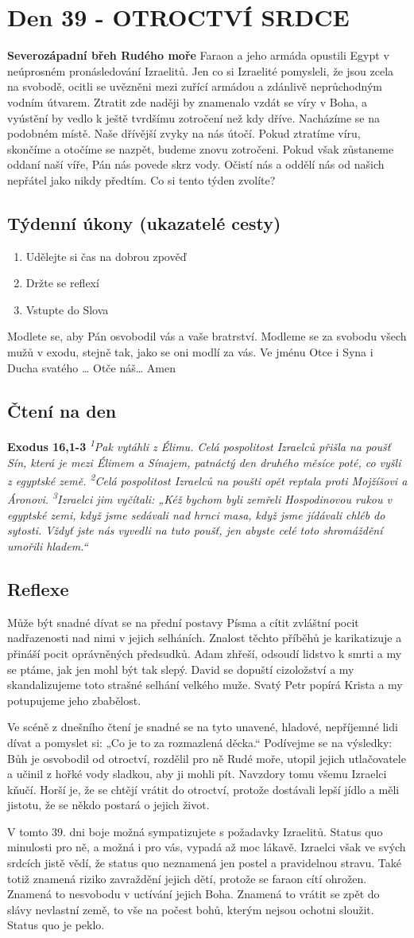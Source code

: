 \documentclass[11pt]{article}
\newcommand{\zacatekSestyTyden}{
  \textbf{Severozápadní břeh Rudého moře} \newline 
  Faraon a jeho armáda opustili Egypt v neúprosném pronásledování Izraelitů. Jen co si Izraelité pomysleli, že jsou zcela na svobodě, ocitli se uvězněni mezi zuřící armádou a zdánlivě neprůchodným vodním útvarem. Ztratit zde naději by znamenalo vzdát se víry v Boha, a vyústění by vedlo k ještě tvrdšímu zotročení než kdy dříve. Nacházíme se na podobném místě. Naše dřívější zvyky na nás útočí. Pokud ztratíme víru, skončíme a otočíme se nazpět, budeme znovu zotročeni. Pokud však zůstaneme oddaní naší víře, Pán nás povede skrz vody. Očistí nás a oddělí nás od našich nepřátel jako nikdy předtím. Co si tento týden zvolíte?

\subsection*{Týdenní úkony (ukazatelé cesty)}
\begin{enumerate}
  \item Udělejte si čas na dobrou zpověď
  \item Držte se reflexí
  \item Vstupte do Slova
\end{enumerate}
Modlete se, aby Pán osvobodil vás a vaše bratrství. \newline
Modleme se za svobodu všech mužů v exodu, stejně tak, jako se oni modlí za vás.\newline
Ve jménu Otce i Syna i Ducha svatého …  Otče náš… Amen
}
\begin{document}
\newpage
\section{Den 39 - OTROCTVÍ SRDCE}
\zacatekSestyTyden
\subsection*{Čtení na den}
\textbf{Exodus 16,1-3}
\newline
\textit{
\textsuperscript{1}Pak vytáhli z Élimu. Celá pospolitost Izraelců přišla na poušť Sín, která je mezi Élimem a Sínajem, patnáctý den druhého měsíce poté, co vyšli z egyptské země.
\textsuperscript{2}Celá pospolitost Izraelců na poušti opět reptala proti Mojžíšovi a Áronovi.
\textsuperscript{3}Izraelci jim vyčítali: „Kéž bychom byli zemřeli Hospodinovou rukou v egyptské zemi, když jsme sedávali nad hrnci masa, když jsme jídávali chléb do sytosti. Vždyť jste nás vyvedli na tuto poušť, jen abyste celé toto shromáždění umořili hladem.“
}

\subsection*{Reflexe}

Může být snadné dívat se na přední postavy Písma a cítit zvláštní pocit nadřazenosti nad nimi v jejich selháních.
Znalost těchto příběhů je karikatizuje a přináší pocit oprávněných předsudků. Adam zhřeší, odsoudí lidstvo k smrti a
my se ptáme, jak jen mohl být tak slepý. David se dopuští cizoložství a my skandalizujeme toto strašné selhání velkého
muže. Svatý Petr popírá Krista a my potupujeme jeho zbabělost.

Ve scéně z dnešního čtení je snadné se na tyto unavené, hladové, nepříjemné lidi dívat a pomyslet si: „Co je to za
rozmazlená děcka.“ Podívejme se na výsledky: Bůh je osvobodil od otroctví, rozdělil pro ně Rudé moře, utopil jejich
utlačovatele a učinil z hořké vody sladkou, aby ji mohli pít. Navzdory tomu všemu Izraelci kňučí. Horší je, že se chtějí
vrátit do otroctví, protože dostávali lepší jídlo a měli jistotu, že se někdo postará o jejich život.

V tomto 39. dni boje možná sympatizujete s požadavky Izraelitů. Status quo minulosti pro ně, a možná i pro vás,
vypadá až moc lákavě. Izraelci však ve svých srdcích jistě vědí, že status quo neznamená jen postel a pravidelnou
stravu. Také totiž znamená riziko zavraždění jejich dětí, protože se faraon cítí ohrožen. Znamená to nesvobodu
v uctívání jejich Boha. Znamená to vrátit se zpět do slávy nevlastní země, to vše na počest bohů, kterým nejsou ochotni
sloužit. Status quo je peklo.
\end{document}
